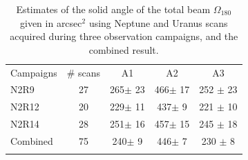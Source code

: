 \begin{table}[!h]
\caption{Estimates of the solid angle of the total beam
  $\Omega_{180}$ given in arcsec$^{2}$ using Neptune and Uranus
  scans acquired during three observation campaigns, and the combined
  result. }
\label{tab:solid}
\centering
\begin{tabular}{l cccc}
\hline\hline
\noalign{\smallskip}
Campaigns  & \# scans & %
A1    &    A2   &  A3  \\%
\noalign{\smallskip}
\hline
\noalign{\smallskip}
N2R9     & 27  &  265$\pm$ 23    &  466$\pm$ 17 & 252 $\pm$ 23 \\%
N2R12    & 20  &  229$\pm$ 11    &  437$\pm$  9 & 221 $\pm$ 10 \\%
N2R14    & 28  &  251$\pm$ 16    &  457$\pm$ 15 & 245 $\pm$ 18 \\%
Combined & 75  &  240$\pm$  9    &  446$\pm$  7 & 230 $\pm$  8 \\%
\noalign{\smallskip}
\hline
\end{tabular}
\end{table}

